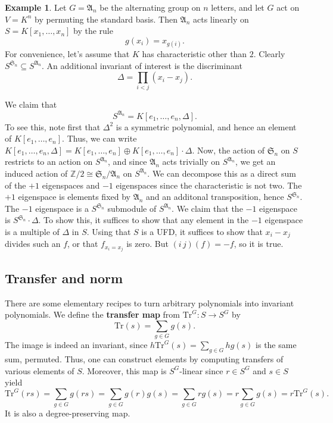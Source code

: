 \documentclass[12pt]{amsart}
\theoremstyle{definition}
\newtheorem{example}[theorem]{Example}
\numberwithin{equation}{theorem}
\def\ZZ{\mathbb{Z}}
\def\to{\longrightarrow}
\begin{document}
\begin{example}
Let $G=\mathfrak{A}_n$ be the alternating group on $n$ letters, and let $G$ act on $V=K^n$ by permuting the standard basis. Then $\mathfrak{A}_n$ acts linearly on $S=K[x_1,\dots,x_n]$ by the rule
\[ g(x_i) = x_{g(i)}.\] For convenience, let's assume that $K$ has characteristic other than $2$. Clearly $S^{\mathfrak{S}_n} \subseteq S^{\mathfrak{A}_n}$. An additional invariant of interest is the discriminant
\[ \Delta= \prod_{i<j} (x_i - x_j).\] 

We claim that \[S^{\mathfrak{A}_n} = K[e_1,\dots,e_n, \Delta].\] To see this, note first that $\Delta^2$ is a symmetric polynomial, and hence an element of $K[e_1,\dots,e_n]$. Thus, we can write $K[e_1,\dots,e_n, \Delta]= K[e_1,\dots,e_n] \oplus K[e_1,\dots,e_n] \cdot \Delta$. Now, the action of $\mathfrak{S}_n$ on $S$ restricts to an action on $S^{\mathfrak{A}_n}$, and since $\mathfrak{A}_n$ acts trivially on $S^{\mathfrak{A}_n}$, we get an induced action of $\ZZ/2 \cong \mathfrak{S}_n / \mathfrak{A}_n$ on $S^{\mathfrak{A}_n}$. We can decompose this as a direct sum of the $+1$ eigenspaces and $-1$ eigenspaces since the characteristic is not two. The $+1$ eigenspace is elements fixed by $\mathfrak{A}_n$ and an additonal transposition, hence $S^{\mathfrak{S}_n}$. The $-1$ eigenspace is a $S^{\mathfrak{S}_n}$ submodule of $S^{\mathfrak{A}_n}$. We claim that the $-1$ eigenspace is $S^{\mathfrak{S}_n} \cdot \Delta$. To show this, it suffices to show that any element in the $-1$ eigenspace is a multiple of $\Delta$ in $S$. Using that $S$ is a UFD, it suffices to show that $x_i-x_j$ divides such an $f$, or that $f_{x_i=x_j}$ is zero. But $(i \, j) (f) = -f$, so it is true.
\end{example}

\subsection*{Transfer and norm}
There are some elementary recipes to turn arbitrary polynomials into invariant polynomials. 
We define the \textbf{transfer map} from $\mathrm{Tr}^G: S \to S^G$ by
\[ \mathrm{Tr}(s) = \sum_{g\in G} g(s).\]
The image is indeed an invariant, since $h \mathrm{Tr}^G(s) = \sum_{g\in G} hg(s)$ is the same sum, permuted. Thus, one can construct elements by computing transfers of various elements of $S$. Moreover, this map is $S^G$-linear since $r\in S^G$ and $s\in S$ yield
\[ \mathrm{Tr}^G(rs) = \sum_{g\in G} g(rs) = \sum_{g\in G} g(r)g(s) = \sum_{g\in G} r g(s) = r \sum_{g\in G} g(s) = r \mathrm{Tr}^G(s).\]  It is also a degree-preserving map.
\end{document}
